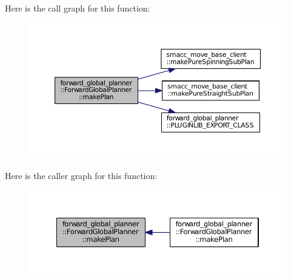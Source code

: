Here is the call graph for this function\+:
\nopagebreak
\begin{figure}[H]
\begin{center}
\leavevmode
\includegraphics[width=350pt]{classforward__global__planner_1_1ForwardGlobalPlanner_a0a358a0d157214dfc0a8a5d11a8f3419_cgraph}
\end{center}
\end{figure}




Here is the caller graph for this function\+:
\nopagebreak
\begin{figure}[H]
\begin{center}
\leavevmode
\includegraphics[width=350pt]{classforward__global__planner_1_1ForwardGlobalPlanner_a0a358a0d157214dfc0a8a5d11a8f3419_icgraph}
\end{center}
\end{figure}


